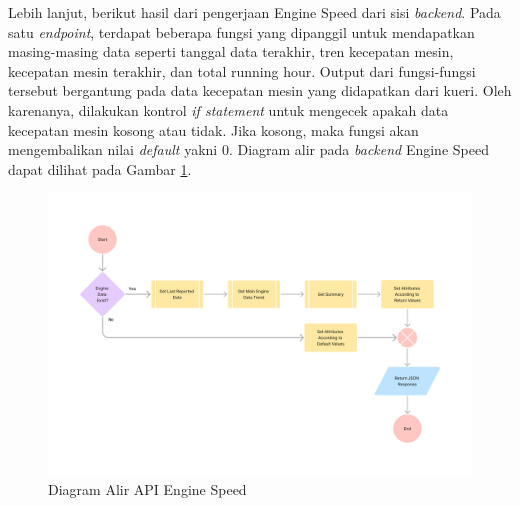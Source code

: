 \newpage

Lebih lanjut, berikut hasil dari pengerjaan Engine Speed dari sisi \textit{backend}. Pada satu \textit{endpoint}, terdapat beberapa fungsi yang dipanggil untuk mendapatkan masing-masing data seperti tanggal data terakhir, tren kecepatan mesin, kecepatan mesin terakhir, dan total running hour. Output dari fungsi-fungsi tersebut bergantung pada data kecepatan mesin yang didapatkan dari kueri. Oleh karenanya, dilakukan kontrol \textit{if statement} untuk mengecek apakah data kecepatan mesin kosong atau tidak. Jika kosong, maka fungsi akan mengembalikan nilai \textit{default} yakni 0. Diagram alir pada \textit{backend} Engine Speed dapat dilihat pada Gambar \ref{fig:flow-be-overview}.

\begin{figure}[!h]
    \includegraphics[width=1.2\linewidth, center]{images/flowcharts/flow-be-overview.png}
    \caption{Diagram Alir API Engine Speed}
    \label{fig:flow-be-overview}
\end{figure}



